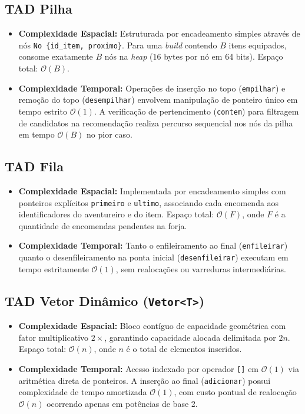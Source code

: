 \documentclass[letterpaper]{article}
\begin{document}
\subsection{TAD Pilha}
\begin{itemize}
    \item \textbf{Complexidade Espacial:} Estruturada por encadeamento simples através de nós \texttt{No \{id\_item, proximo\}}. Para uma \textit{build} contendo $B$ itens equipados, consome exatamente $B$ nós na \textit{heap} ($16$ bytes por nó em 64 bits). Espaço total: $\mathcal{O}(B)$.
    \item \textbf{Complexidade Temporal:} Operações de inserção no topo (\texttt{empilhar}) e remoção do topo (\texttt{desempilhar}) envolvem manipulação de ponteiro único em tempo estrito $\mathcal{O}(1)$. A verificação de pertencimento (\texttt{contem}) para filtragem de candidatos na recomendação realiza percurso sequencial nos nós da pilha em tempo $\mathcal{O}(B)$ no pior caso.
\end{itemize}

\subsection{TAD Fila}
\begin{itemize}
    \item \textbf{Complexidade Espacial:} Implementada por encadeamento simples com ponteiros explícitos \texttt{primeiro} e \texttt{ultimo}, associando cada encomenda aos identificadores do aventureiro e do item. Espaço total: $\mathcal{O}(F)$, onde $F$ é a quantidade de encomendas pendentes na forja.
    \item \textbf{Complexidade Temporal:} Tanto o enfileiramento ao final (\texttt{enfileirar}) quanto o desenfileiramento na ponta inicial (\texttt{desenfileirar}) executam em tempo estritamente $\mathcal{O}(1)$, sem realocações ou varreduras intermediárias.
\end{itemize}

\subsection{TAD Vetor Dinâmico (\texttt{Vetor<T>})}
\begin{itemize}
    \item \textbf{Complexidade Espacial:} Bloco contíguo de capacidade geométrica com fator multiplicativo $2\times$, garantindo capacidade alocada delimitada por $2n$. Espaço total: $\mathcal{O}(n)$, onde $n$ é o total de elementos inseridos.
    \item \textbf{Complexidade Temporal:} Acesso indexado por operador \texttt{[]} em $\mathcal{O}(1)$ via aritmética direta de ponteiros. A inserção ao final (\texttt{adicionar}) possui complexidade de tempo amortizada $\mathcal{O}(1)$, com custo pontual de realocação $\mathcal{O}(n)$ ocorrendo apenas em potências de base 2.
\end{itemize}
\end{document}
